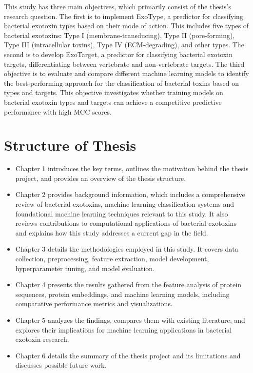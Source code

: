 This study has three main objectives, which primarily consist of the thesis's research question.
The first is to implement ExoType, a predictor for classifying bacterial exotoxin types based on their mode of action.
This includes five types of bacterial exotoxins: Type I (membrane-transducing), Type II (pore-forming), Type III (intracellular toxins), Type IV (ECM-degrading), and other types.
The second is to develop ExoTarget, a predictor for classifying bacterial exotoxin targets, differentiating between vertebrate and non-vertebrate targets.
The third objective is to evaluate and compare different machine learning models to identify the best-performing approach for the classification of bacterial toxins based on types and targets.
This objective investigates whether training models on bacterial exotoxin types and targets can achieve a competitive predictive performance with high \gls{MCC} scores.

\section{Structure of Thesis}

\begin{itemize}
	
	\item Chapter 1 introduces the key terms, outlines the motivation behind the thesis project, and provides an overview of the thesis structure.
	\item Chapter 2 provides background information, which includes a comprehensive review of bacterial exotoxins, machine learning classification systems and foundational machine learning techniques relevant to this study. It also reviews contributions to computational applications of bacterial exotoxins and explains how this study addresses a current gap in the field.
	\item Chapter 3 details the methodologies employed in this study. It covers data collection, preprocessing, feature extraction, model development, hyperparameter tuning, and model evaluation.
	\item Chapter 4 presents the results gathered from the feature analysis of protein sequences, protein embeddings, and machine learning models, including comparative performance metrics and visualizations. 
	\item Chapter 5 analyzes the findings, compares them with existing literature, and explores their implications for machine learning applications in bacterial exotoxin research.
	\item Chapter 6 details the summary of the thesis project and its limitations and discusses possible future work.
	
\end{itemize}
